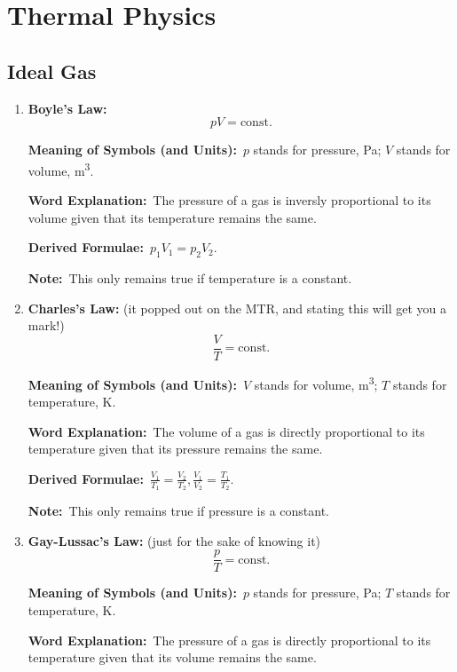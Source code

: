 \documentclass[8pt]{article}
\newcommand{\MeanSymb}{\textbf{Meaning of Symbols (and Units):}\ }
\newcommand{\WordExpl}{\textbf{Word Explanation:}\ }
\newcommand{\DeriForm}{\textbf{Derived Formulae:}\ }
\newcommand{\Note}{\textbf{Note:}\ }
\begin{document}
    \section{Thermal Physics}
        \subsection{Ideal Gas}
            \begin{enumerate}
                \item \textbf{Boyle's Law:}
                \[
                    pV = \mathrm{const.}
                \]

                \MeanSymb \(p\) stands for pressure, \unit{\pascal}; \(V\) stands for volume, \unit{\metre \cubed}.

                \WordExpl The pressure of a gas is inversly proportional to its volume given that its temperature remains the same.

                \DeriForm \(p_1 V_1 = p_2 V_2\).

                \Note This only remains true if temperature is a constant.
                
                \item \textbf{Charles's Law:} (it popped out on the MTR, and stating this will get you a mark!)
                \[
                    \frac{V}{T} = \mathrm{const.}
                \]

                \MeanSymb \(V\) stands for volume, \unit{\metre \cubed}; \(T\) stands for temperature, \unit{\kelvin}.

                \WordExpl The volume of a gas is directly proportional to its temperature given that its pressure remains the same.

                \DeriForm \(\frac{V_1}{T_1} = \frac{V_2}{T_2}, \frac{V_1}{V_2} = \frac{T_1}{T_2}\).

                \Note This only remains true if pressure is a constant.
                
                \item \textbf{Gay-Lussac's Law:} (just for the sake of knowing it)
                \[
                    \frac{p}{T} = \mathrm{const.}
                \]

                \MeanSymb \(p\) stands for pressure, \unit{\pascal}; \(T\) stands for temperature, \unit{\kelvin}.

                \WordExpl The pressure of a gas is directly proportional to its temperature given that its volume remains the same.


\end{enumerate}
\end{document}
